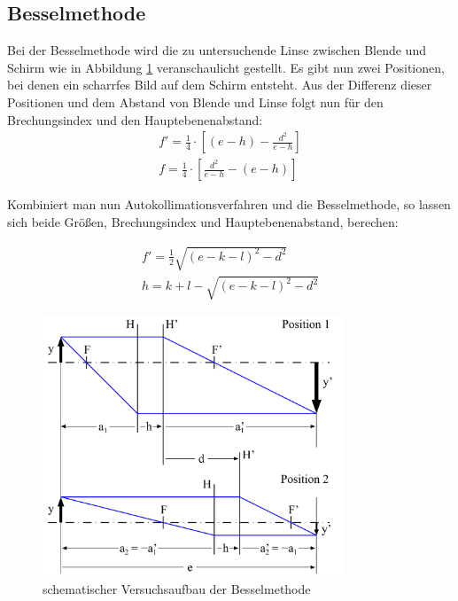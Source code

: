 \documentclass[11pt, a4paper]{article}
\begin{document}
    \subsection{Besselmethode}
    Bei der Besselmethode wird die zu untersuchende Linse zwischen Blende und Schirm wie in Abbildung \ref{fig:BesselAbb} veranschaulicht gestellt.
    Es gibt nun zwei Positionen, bei denen ein scharrfes Bild auf dem Schirm entsteht. Aus der Differenz dieser Positionen und dem Abstand von Blende und Linse folgt nun für den Brechungsindex und den Hauptebenenabstand:
    \begin{align}
    
        f' = \frac{1}{4} \cdot [(e-h)-\frac{d^2}{e-h}] \label{eq:besselBrech1}\\
        f = \frac{1}{4} \cdot [\frac{d^2}{e-h}-(e-h)] \label{eq:besselBrech2}
            
    \end{align}

    Kombiniert man nun Autokollimationsverfahren und die Besselmethode, so lassen sich beide Größen, Brechungsindex und Hauptebenenabstand, berechen:
    
    \begin{align}
    
        f' = \frac{1}{2} \sqrt{(e-k-l)^2-d^2}\\
        h = k+l- \sqrt{(e-k-l)^2-d^2}
            
    \end{align}
    

    \begin{figure}
        \centering
        \includegraphics[width=0.8\textwidth]{Bessel_Abb.png}
        \caption{schematischer Versuchsaufbau der Besselmethode}   %
        \label{fig:BesselAbb}
    \end{figure}
\end{document}
